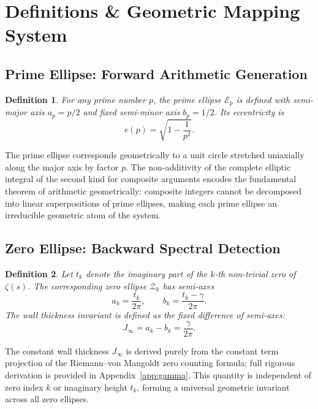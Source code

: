 \documentclass[10pt,reqno]{article}
\newcommand{\gammaconst}{\gamma}
\newcommand{\Jinf}{J_\infty}
\newcommand{\azero}{a_k}
\newcommand{\bzero}{b_k}
\newcommand{\eprimep}{e(p)}
\newtheorem{defn}{Definition}[section]
\begin{document}
\section{Definitions \& Geometric Mapping System}
\label{sec:definitions}

\subsection{Prime Ellipse: Forward Arithmetic Generation}
\label{subsec:prime-ellipse}

\begin{defn}\label{def:prime-ellipse}
For any prime number $p$, the \emph{prime ellipse} $\mathcal{E}_p$ is defined with semi-major axis $a_p=p/2$ and fixed semi-minor axis $b_p=1/2$. Its eccentricity is
\[
\eprimep = \sqrt{1-\frac{1}{p^2}}.
\]
\end{defn}

The prime ellipse corresponds geometrically to a unit circle stretched uniaxially along the major axis by factor $p$. The non-additivity of the complete elliptic integral of the second kind for composite arguments encodes the fundamental theorem of arithmetic geometrically: composite integers cannot be decomposed into linear superpositions of prime ellipses, making each prime ellipse an irreducible geometric atom of the system.

\subsection{Zero Ellipse: Backward Spectral Detection}
\label{subsec:zero-ellipse}

\begin{defn}\label{def:zero-ellipse}
Let $t_k$ denote the imaginary part of the $k$-th non-trivial zero of $\zeta(s)$. The corresponding \emph{zero ellipse} $\mathcal{Z}_k$ has semi-axes
\begin{equation}
\azero = \frac{t_k}{2\pi}, \qquad \bzero = \frac{t_k-\gammaconst}{2\pi}.
\label{eq:ellipse-params}
\end{equation}
The wall thickness invariant is defined as the fixed difference of semi-axes:
\[
\Jinf = \azero - \bzero = \frac{\gammaconst}{2\pi}.
\]
\end{defn}

The constant wall thickness $\Jinf$ is derived purely from the constant term projection of the Riemann--von Mangoldt zero counting formula; full rigorous derivation is provided in Appendix~\ref{app:gamma}. This quantity is independent of zero index $k$ or imaginary height $t_k$, forming a universal geometric invariant across all zero ellipses.
\end{document}
